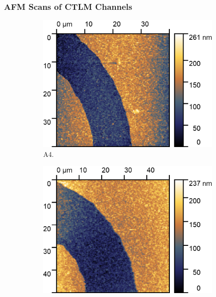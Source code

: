 \begin{refsection}
\subsubsection{AFM Scans of CTLM Channels}
\label{subsubsec:afm_scans_of_ctlm}
\begin{figure}[H]
    \centering
    \begin{subfigure}[b]{0.45\textwidth}
        \includegraphics[width=\textwidth]{Chapter3/Figs/Raster/Sample F 2022/a4_afm.png}
        \caption{A4.}
        \label{fig:a4_afm}
    \end{subfigure}
    \hfill %
    \begin{subfigure}[b]{0.45\textwidth}
        \includegraphics[width=\textwidth]{Chapter3/Figs/Raster/Sample F 2022/a5_afm.png}

\end{subfigure}
\end{figure}
\end{refsection}

